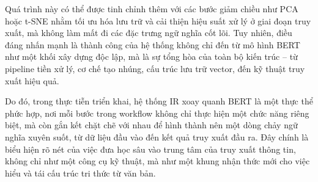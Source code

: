 Quá trình này có thể được tinh chỉnh thêm với các bước giảm chiều như PCA hoặc t-SNE nhằm tối ưu hóa lưu trữ và cải thiện hiệu suất xử lý ở giai đoạn truy xuất, mà không làm mất đi các đặc trưng ngữ nghĩa cốt lõi. Tuy nhiên, điều đáng nhấn mạnh là thành công của hệ thống không chỉ đến từ mô hình BERT như một khối xây dựng độc lập, mà là sự tổng hòa của toàn bộ kiến trúc -- từ pipeline tiền xử lý, cơ chế tạo nhúng, cấu trúc lưu trữ vector, đến kỹ thuật truy xuất hiệu quả.

Do đó, trong thực tiễn triển khai, hệ thống IR xoay quanh BERT là một thực thể phức hợp, nơi mỗi bước trong workflow không chỉ thực hiện một chức năng riêng biệt, mà còn gắn kết chặt chẽ với nhau để hình thành nên một dòng chảy ngữ nghĩa xuyên suốt, từ dữ liệu đầu vào đến kết quả truy xuất đầu ra. Đây chính là biểu hiện rõ nét của việc đưa học sâu vào trung tâm của truy xuất thông tin, không chỉ như một công cụ kỹ thuật, mà như một khung nhận thức mới cho việc hiểu và tái cấu trúc tri thức từ văn bản.
